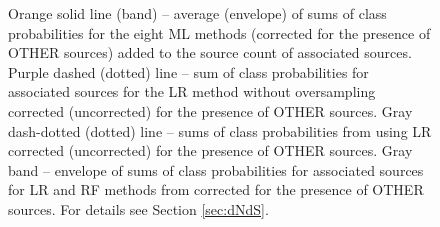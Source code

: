 \begin{figure}[h]
{Orange solid line (band) -- average (envelope) of sums of class probabilities for the eight ML methods (corrected for the presence of OTHER sources) added to the source count of associated sources. 
Purple dashed (dotted) line -- sum of class probabilities for associated sources for the LR method without oversampling corrected (uncorrected)
for the presence of OTHER sources.
Gray dash-dotted (dotted) line -- sums of class probabilities from \cite{2016ApJ...820....8S} using LR corrected (uncorrected) for the presence of OTHER sources.
Gray band -- envelope of sums of class probabilities for associated sources for LR and RF methods from \cite{2016ApJ...820....8S} corrected for the presence of OTHER sources.
For details see Section \ref{sec:dNdS}.}  
\label{fig:logN_logS}
\end{figure}


